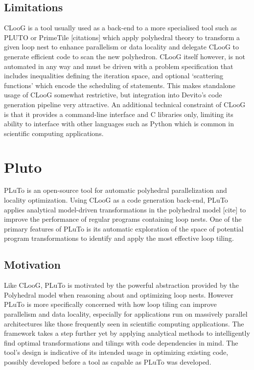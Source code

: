 \documentclass[a4paper,12pt,twoside]{report}
\begin{document}
\subsection{Limitations}
CLooG is a tool usually used as a back-end to a more specialised tool such as PLUTO or PrimeTile [citations] which
apply polyhedral theory to transform a given loop nest to enhance parallelism or data locality and delegate CLooG to generate
efficient code to scan the new polyhedron. CLooG itself however, is not automated in any way and must be driven with a problem
specification that includes inequalities defining the iteration space, and optional `scattering functions' which encode the scheduling
of statements. This makes standalone usage of CLooG somewhat restrictive, but integration into Devito's code generation pipeline
very attractive. An additional technical constraint of CLooG is that it provides a command-line interface and C libraries only,
limiting its ability to interface with other languages such as Python which is common in scientific computing applications.

\section{Pluto}
PLuTo is an open-source tool for automatic polyhedral parallelization and locality optimization. Using CLooG as a code generation
back-end, PLuTo applies analytical model-driven transformations in the polyhedral model [cite] to improve the performance
of regular programs containing loop nests. One of the primary features of PLuTo is its automatic exploration of the space
of potential program transformations to identify and apply the most effective loop tiling.

\subsection{Motivation}
Like CLooG, PLuTo is motivated by the powerful abstraction provided by the Polyhedral model when reasoning about and optimizing loop
nests. However PLuTo is more specifically concerned with how loop tiling can improve parallelism and data locality, especially
for applications run on massively parallel architectures like those frequently seen in scientific computing applications. The framework
takes a step further yet by applying analytical methods to intelligently find optimal transformations and tilings with code dependencies in mind.
The tool's design is indicative of its intended usage in optimizing existing code, possibly developed before a tool as capable as PLuTo was developed.
\end{document}
